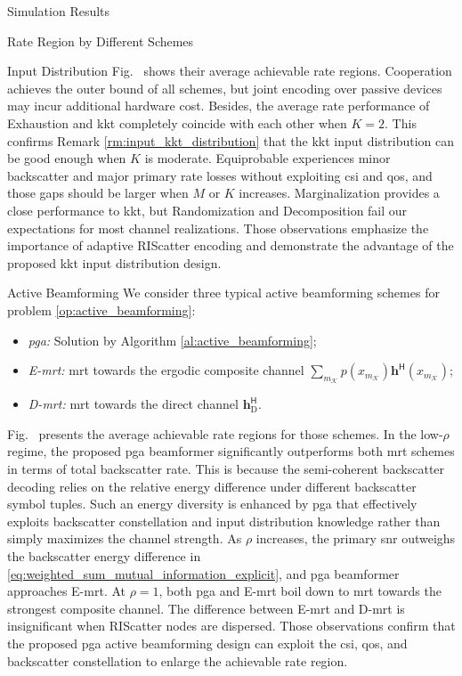 \begin{section}{Simulation Results}
\begin{subsection}{Rate Region by Different Schemes}
\begin{subsubsection}{Input Distribution}
			Fig.~ shows their average achievable rate regions.
			Cooperation achieves the outer bound of all schemes, but joint encoding over passive devices may incur additional hardware cost.
			Besides, the average rate performance of Exhaustion and \gls{kkt} completely coincide with each other when $K=2$.
			This confirms Remark \ref{rm:input_kkt_distribution} that the \gls{kkt} input distribution can be good enough when $K$ is moderate.
			Equiprobable experiences minor backscatter and major primary rate losses without exploiting \gls{csi} and \gls{qos}, and those gaps should be larger when $M$ or $K$ increases.
			Marginalization provides a close performance to \gls{kkt}, but Randomization and Decomposition fail our expectations for most channel realizations.
			Those observations emphasize the importance of adaptive RIScatter encoding and demonstrate the advantage of the proposed \gls{kkt} input distribution design.
		\end{subsubsection}

		\begin{subsubsection}{Active Beamforming}
			We consider three typical active beamforming schemes for problem \eqref{op:active_beamforming}:
			\begin{itemize}
				\item \emph{\gls{pga}:} Solution by Algorithm \ref{al:active_beamforming};
				\item \emph{E-\gls{mrt}:} \gls{mrt} towards the ergodic composite channel $\sum_{m_{\mathcal{K}}} p(x_{m_{\mathcal{K}}}) \mathbf{h}^\mathsf{H}(x_{m_{\mathcal{K}}})$;
				\item \emph{D-\gls{mrt}:} \gls{mrt} towards the direct channel $\mathbf{h}_{\text{D}}^\mathsf{H}$.
			\end{itemize}

			Fig.~ presents the average achievable rate regions for those schemes.
			In the low-$\rho$ regime, the proposed \gls{pga} beamformer significantly outperforms both \gls{mrt} schemes in terms of total backscatter rate.
			This is because the semi-coherent backscatter decoding relies on the relative energy difference under different backscatter symbol tuples.
			Such an energy diversity is enhanced by \gls{pga} that effectively exploits backscatter constellation and input distribution knowledge rather than simply maximizes the channel strength.
			As $\rho$ increases, the primary \gls{snr} outweighs the backscatter energy difference in \eqref{eq:weighted_sum_mutual_information_explicit}, and \gls{pga} beamformer approaches E-\gls{mrt}.
			At $\rho=1$, both \gls{pga} and E-\gls{mrt} boil down to \gls{mrt} towards the strongest composite channel.
			The difference between E-\gls{mrt} and D-\gls{mrt} is insignificant when RIScatter nodes are dispersed.
			Those observations confirm that the proposed \gls{pga} active beamforming design can exploit the \gls{csi}, \gls{qos}, and backscatter constellation to enlarge the achievable rate region.
		\end{subsubsection}


\end{subsection}
\end{section}
